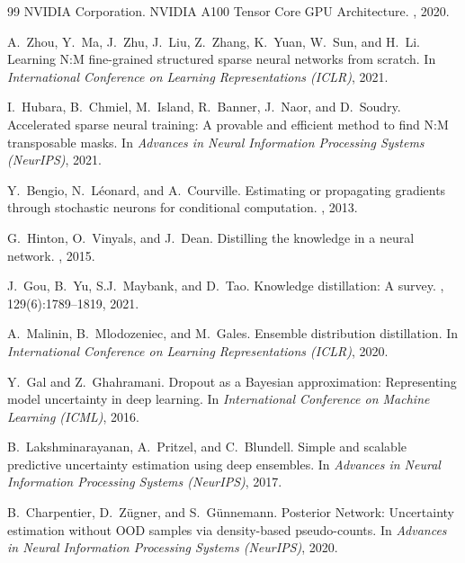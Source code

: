 \documentclass[letterpaper]{article} %
\begin{document}
\begin{thebibliography}{99}
NVIDIA Corporation.
\newblock NVIDIA A100 Tensor Core GPU Architecture.
, 2020.

A.~Zhou, Y.~Ma, J.~Zhu, J.~Liu, Z.~Zhang, K.~Yuan, W.~Sun, and H.~Li.
\newblock Learning N:M fine-grained structured sparse neural networks from scratch.
\newblock In {\em International Conference on Learning Representations (ICLR)}, 2021.

I.~Hubara, B.~Chmiel, M.~Island, R.~Banner, J.~Naor, and D.~Soudry.
\newblock Accelerated sparse neural training: A provable and efficient method to find N:M transposable masks.
\newblock In {\em Advances in Neural Information Processing Systems (NeurIPS)}, 2021.


Y.~Bengio, N.~L{\'e}onard, and A.~Courville.
\newblock Estimating or propagating gradients through stochastic neurons for conditional computation.
, 2013.


G.~Hinton, O.~Vinyals, and J.~Dean.
\newblock Distilling the knowledge in a neural network.
, 2015.

J.~Gou, B.~Yu, S.J.~Maybank, and D.~Tao.
\newblock Knowledge distillation: A survey.
, 129(6):1789--1819, 2021.

A.~Malinin, B.~Mlodozeniec, and M.~Gales.
\newblock Ensemble distribution distillation.
\newblock In {\em International Conference on Learning Representations (ICLR)}, 2020.


Y.~Gal and Z.~Ghahramani.
\newblock Dropout as a Bayesian approximation: Representing model uncertainty in deep learning.
\newblock In {\em International Conference on Machine Learning (ICML)}, 2016.

B.~Lakshminarayanan, A.~Pritzel, and C.~Blundell.
\newblock Simple and scalable predictive uncertainty estimation using deep ensembles.
\newblock In {\em Advances in Neural Information Processing Systems (NeurIPS)}, 2017.

B.~Charpentier, D.~Z{\"u}gner, and S.~G{\"u}nnemann.
\newblock Posterior Network: Uncertainty estimation without OOD samples via density-based pseudo-counts.
\newblock In {\em Advances in Neural Information Processing Systems (NeurIPS)}, 2020.


\end{thebibliography}
\end{document}
